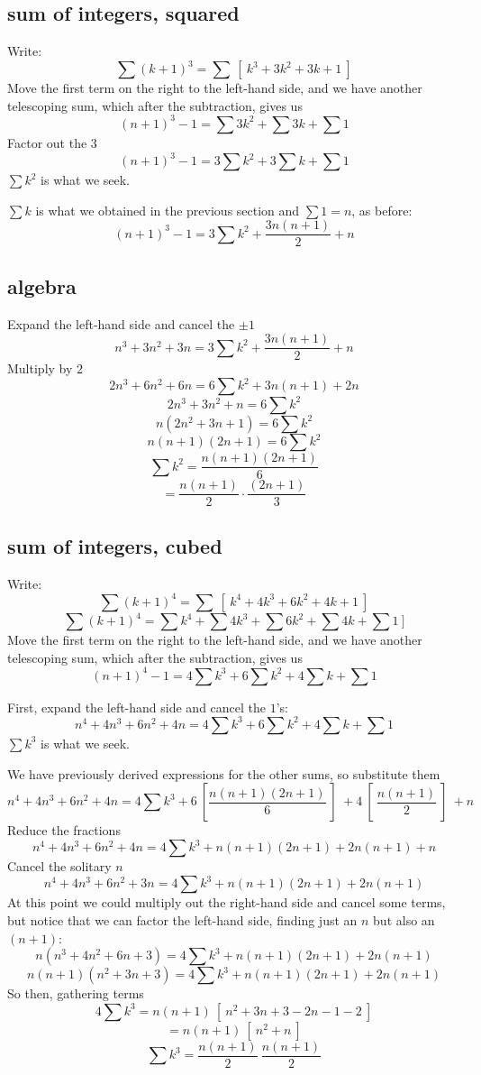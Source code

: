 \documentclass[11pt, oneside]{article}
\begin{document}
\subsection*{sum of integers, squared}
Write:
\[ \sum (k + 1)^3 = \sum \ [ \ k^3 + 3k^2 + 3k + 1 \ ] \]
Move the first term on the right to the left-hand side, and we have another telescoping sum, which after the subtraction, gives us
\[ (n + 1)^3 - 1 = \sum 3k^2 + \sum 3k + \sum 1 \]
Factor out the $3$
\[ (n + 1)^3 - 1 = 3 \sum k^2 + 3 \sum k + \sum 1 \]
$\sum k^2$ is what we seek.  

$\sum k$ is what we obtained in the previous section and $\sum 1 = n$, as before:
\[ (n + 1)^3 - 1 = 3 \sum k^2 + \frac{3n(n+1)}{2} + n \]
\subsection*{algebra}
Expand the left-hand side and cancel the $\pm 1$
\[ n^3 + 3n^2 + 3n = 3 \sum k^2 + \frac{3n(n+1)}{2} + n \]
Multiply by $2$
\[ 2n^3 + 6n^2 + 6n = 6 \sum k^2 + 3n(n+1) + 2n \]
\[ 2n^3 + 3n^2 + n = 6 \sum k^2  \]
\[ n(2n^2 + 3n + 1) = 6 \sum k^2  \]
\[ n(n + 1)(2n + 1) = 6 \sum k^2  \]
\[  \sum k^2 = \frac{n(n + 1)(2n + 1)}{6} \]
\[ = \frac{n(n+1)}{2} \cdot \frac{(2n+1)}{3} \]

\subsection*{sum of integers, cubed}
Write:
\[ \sum (k + 1)^4 = \sum \ [ \ k^4 + 4k^3 + 6k^2 + 4k + 1 \ ] \]
\[ \sum (k + 1)^4 = \sum k^4 + \sum 4k^3 + \sum 6k^2 + \sum 4k + \sum 1 \ ] \]
Move the first term on the right to the left-hand side, and we have another telescoping sum, which after the subtraction, gives us
\[ (n + 1)^4 - 1 = 4 \sum k^3 + 6 \sum k^2 + 4 \sum k + \sum 1 \] 

First, expand the left-hand side and cancel the $1$'s:
\[ n^4 + 4n^3 + 6n^2 + 4n =  4 \sum k^3 + 6 \sum k^2 + 4 \sum k + \sum 1 \]
$\sum k^3$ is what we seek. 

We have previously derived expressions for the other sums, so substitute them
\[ n^4 + 4n^3 + 6n^2 + 4n =  4 \sum k^3 + 6 \ [ \frac{n(n + 1)(2n+1)}{6} \ ] \ + 4 \ [ \ \frac{n(n + 1)}{2}  \ ] \ + n \]
Reduce the fractions
\[ n^4 + 4n^3 + 6n^2 + 4n =  4 \sum k^3 + n(n + 1)(2n+1) + 2 n(n + 1) + n \]
Cancel the solitary $n$
\[ n^4 + 4n^3 + 6n^2 + 3n =  4 \sum k^3 + n(n + 1)(2n+1) + 2 n(n + 1)  \]
At this point we could multiply out the right-hand side and cancel some terms, but notice that we can factor the left-hand side, finding just an $n$ but also an $(n+1)$:
\[ n(n^3 + 4n^2 + 6n + 3) =  4 \sum k^3 + n(n + 1)(2n+1) + 2 n(n + 1)  \]
\[ n(n+1)(n^2 + 3n + 3) =  4 \sum k^3 + n(n + 1)(2n+1) + 2 n(n + 1)  \]
So then, gathering terms 
\[ 4 \sum k^3 = n(n+1) \ [ \ n^2 + 3n + 3 - 2n - 1 - 2 \ ]  \]
\[ = n(n+1) \ [ \ n^2 + n \ ]  \]
\[ \sum k^3 = \frac{n(n+1)}{2} \ \frac{n(n+1)}{2} \]
\end{document}
